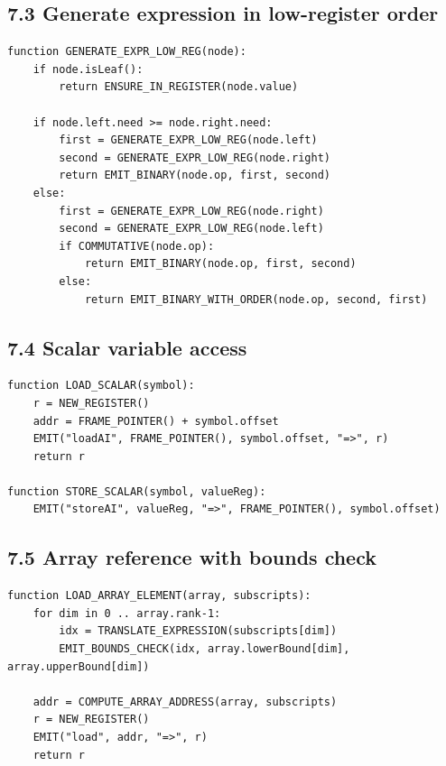 \documentclass[10pt,letterpaper]{article}
\begin{document}
\subsection*{7.3 Generate expression in low-register order}

\begin{verbatim}
function GENERATE_EXPR_LOW_REG(node):
    if node.isLeaf():
        return ENSURE_IN_REGISTER(node.value)

    if node.left.need >= node.right.need:
        first = GENERATE_EXPR_LOW_REG(node.left)
        second = GENERATE_EXPR_LOW_REG(node.right)
        return EMIT_BINARY(node.op, first, second)
    else:
        first = GENERATE_EXPR_LOW_REG(node.right)
        second = GENERATE_EXPR_LOW_REG(node.left)
        if COMMUTATIVE(node.op):
            return EMIT_BINARY(node.op, first, second)
        else:
            return EMIT_BINARY_WITH_ORDER(node.op, second, first)
\end{verbatim}

\subsection*{7.4 Scalar variable access}

\begin{verbatim}
function LOAD_SCALAR(symbol):
    r = NEW_REGISTER()
    addr = FRAME_POINTER() + symbol.offset
    EMIT("loadAI", FRAME_POINTER(), symbol.offset, "=>", r)
    return r

function STORE_SCALAR(symbol, valueReg):
    EMIT("storeAI", valueReg, "=>", FRAME_POINTER(), symbol.offset)
\end{verbatim}

\subsection*{7.5 Array reference with bounds check}

\begin{verbatim}
function LOAD_ARRAY_ELEMENT(array, subscripts):
    for dim in 0 .. array.rank-1:
        idx = TRANSLATE_EXPRESSION(subscripts[dim])
        EMIT_BOUNDS_CHECK(idx, array.lowerBound[dim], array.upperBound[dim])

    addr = COMPUTE_ARRAY_ADDRESS(array, subscripts)
    r = NEW_REGISTER()
    EMIT("load", addr, "=>", r)
    return r
\end{verbatim}
\end{document}
